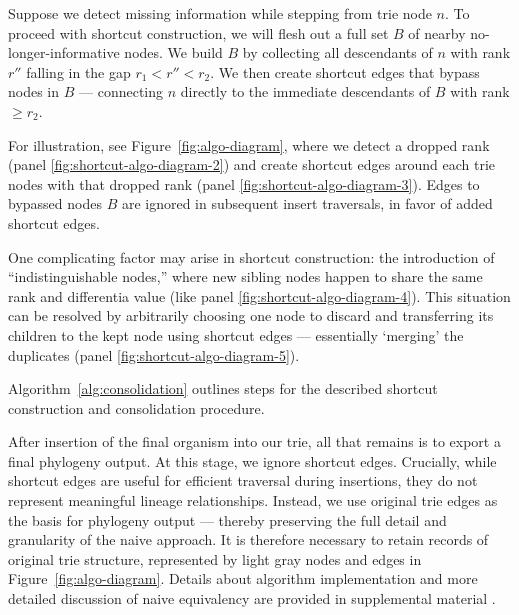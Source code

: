 Suppose we detect missing information while stepping from trie node $n$.
To proceed with shortcut construction, we will flesh out a full set $B$ of nearby no-longer-informative nodes.
We build $B$ by collecting all descendants of $n$ with rank $r''$ falling in the gap $r_1 < r'' < r_2$.
We then create shortcut edges that bypass nodes in $B$ --- connecting $n$ directly to the immediate descendants of $B$ with rank $\geq r_2$.

For illustration, see Figure~\ref{fig:algo-diagram}, where we detect a dropped rank (panel \ref{fig:shortcut-algo-diagram-2}) and create shortcut edges around each trie nodes with that dropped rank (panel \ref{fig:shortcut-algo-diagram-3}).
Edges to bypassed nodes $B$ are ignored in subsequent insert traversals, in favor of added shortcut edges.

One complicating factor may arise in shortcut construction: the introduction of ``indistinguishable nodes,'' where new sibling nodes happen to share the same rank and differentia value (like panel \ref{fig:shortcut-algo-diagram-4}).
This situation can be resolved by arbitrarily choosing one node to discard and transferring its children to the kept node using shortcut edges --- essentially `merging' the duplicates (panel \ref{fig:shortcut-algo-diagram-5}).

Algorithm~\ref{alg:consolidation} outlines steps for the described shortcut construction and consolidation procedure.



After insertion of the final organism into our trie, all that remains is to export a final phylogeny output.
At this stage, we ignore shortcut edges.
Crucially, while shortcut edges are useful for efficient traversal during insertions, they do not represent meaningful lineage relationships.
Instead, we use original trie edges as the basis for phylogeny output --- thereby preserving the full detail and granularity of the naive approach.
It is therefore necessary to retain records of original trie structure, represented by light gray nodes and edges in Figure~\ref{fig:algo-diagram}.
Details about algorithm implementation and more detailed discussion of naive equivalency are provided in supplemental material \citep{supplemental}.
